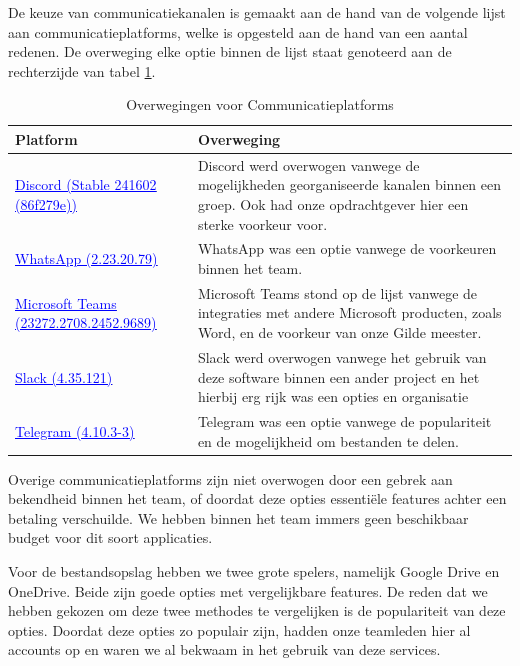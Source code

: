 \documentclass[a4paper]{report}
\newcommand{\styledhref}[2]{%
    \href{#1}{\textcolor{blue}{\underline{#2}}} %
}
\begin{document}
De keuze van communicatiekanalen is gemaakt aan de hand van de volgende lijst aan communicatieplatforms, welke is opgesteld aan de hand van een aantal redenen.
De overweging elke optie binnen de lijst staat genoteerd aan de rechterzijde van tabel \ref{tab:comm_platforms}.
\begin{table}[H]
  \centering
  \begin{tabular}{|l|p{10cm}|}
    \hline
    \textbf{Platform} & \textbf{Overweging} \\
    \hline
    \styledhref{https://discord.com/}{Discord (Stable 241602 (86f279e))} & Discord werd overwogen vanwege de mogelijkheden georganiseerde kanalen binnen een groep. Ook had onze opdrachtgever hier een sterke voorkeur voor. \\
    \hline
    \styledhref{https://www.whatsapp.com/}{WhatsApp (2.23.20.79)} & WhatsApp was een optie vanwege de voorkeuren binnen het team. \\
    \hline
    \styledhref{https://www.microsoft.com/en-us/microsoft-teams/group-chat-software}{Microsoft Teams (23272.2708.2452.9689)} & Microsoft Teams stond op de lijst vanwege de integraties met andere Microsoft producten, zoals Word, en de voorkeur van onze Gilde meester. \\
    \hline
    \styledhref{https://slack.com/}{Slack (4.35.121)} & Slack werd overwogen vanwege het gebruik van deze software binnen een ander project en het hierbij erg rijk was een opties en organisatie \\
    \hline
    \styledhref{https://telegram.org/}{Telegram (4.10.3-3)} & Telegram was een optie vanwege de populariteit en de mogelijkheid om bestanden te delen. \\
    \hline
  \end{tabular}
  \caption{Overwegingen voor Communicatieplatforms}
  \label{tab:comm_platforms}
\end{table}
Overige communicatieplatforms zijn niet overwogen door een gebrek aan bekendheid binnen het team, of doordat deze opties essentiële features achter een betaling verschuilde.
We hebben binnen het team immers geen beschikbaar budget voor dit soort applicaties.
\par\smallskip
Voor de bestandsopslag hebben we twee grote spelers, namelijk Google Drive en OneDrive. 
Beide zijn goede opties met vergelijkbare features. De reden dat we hebben gekozen om deze twee methodes te vergelijken is de populariteit van deze opties.
Doordat deze opties zo populair zijn, hadden onze teamleden hier al accounts op en waren we al bekwaam in het gebruik van deze services.
\end{document}
